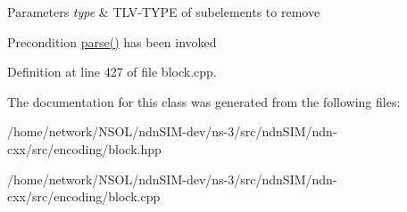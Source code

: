 \begin{DoxyParams}{Parameters}
{\em type} & T\+L\+V-\/\+T\+Y\+PE of subelements to remove \\
\hline
\end{DoxyParams}
\begin{DoxyPrecond}{Precondition}
\hyperlink{classndn_1_1Block_ad0639ee88657cf843974fc265c137816}{parse()} has been invoked 
\end{DoxyPrecond}


Definition at line 427 of file block.\+cpp.



The documentation for this class was generated from the following files\+:\begin{DoxyCompactItemize}
\item 
/home/network/\+N\+S\+O\+L/ndn\+S\+I\+M-\/dev/ns-\/3/src/ndn\+S\+I\+M/ndn-\/cxx/src/encoding/block.\+hpp\item 
/home/network/\+N\+S\+O\+L/ndn\+S\+I\+M-\/dev/ns-\/3/src/ndn\+S\+I\+M/ndn-\/cxx/src/encoding/block.\+cpp\end{DoxyCompactItemize}
